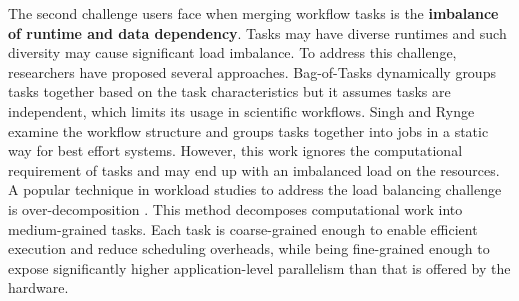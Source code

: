 The second challenge users face when merging workflow tasks is the \textbf{imbalance of runtime and data dependency}. Tasks may have diverse runtimes and such diversity may cause significant load imbalance. To address this challenge, researchers have proposed several approaches. Bag-of-Tasks \cite{Hussin2010, Celaya2010, Oprescu2010} dynamically groups tasks together based on the task characteristics but it assumes tasks are independent, which limits its usage in scientific workflows. Singh \cite{Singh2008} and Rynge \cite{Rynge2012} examine the workflow structure and groups tasks together into jobs in a static way for best effort systems. However, this work ignores the computational requirement of tasks and may end up with an imbalanced load on the resources. A popular technique in workload studies to address the load balancing challenge is over-decomposition \cite{Lifflander2012}. This method decomposes computational work into medium-grained tasks. Each task is coarse-grained enough to enable efficient execution and reduce scheduling overheads, while being fine-grained enough to expose significantly higher application-level parallelism than that is offered by the hardware. 




